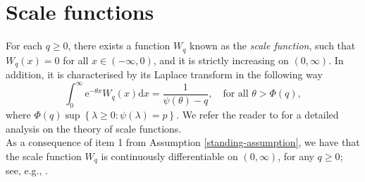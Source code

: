 \documentclass[10pt,a4paper]{amsart}
\newtheorem{remark}{Remark}[section]
\newcommand{\reals}{\mathbb{R}}
\newcommand{\diff}{\mathrm{d}}
\newcommand{\cH}{\mathcal{H}}
\renewcommand{\geq}{\geqslant}
\begin{document}
%
%
\section{Scale functions}\label{sect:scale}
For each $q \geq 0$, there exists a function $W_q$ known as the \textit{scale function}, such that $W_q(x) = 0$ for all $x\in (-\infty,0)$, and it is strictly increasing on $(0,\infty)$. In addition, it is characterised by its Laplace transform in the following way
\begin{equation}\label{scale:function:def}
	\int_0^\infty \mathrm{e}^{-\theta x} W_q (x) \mathrm{d}x = \frac{1}{\psi(\theta)-q} , \quad \text{for all $\theta> \Phi(q),$}
\end{equation}
where $\Phi(q)\sup \left\lbrace \lambda \geq 0 \colon \psi(\lambda)=p \right\rbrace$. We refer the reader to \cite{kuznetsov-et-al_2012} for a detailed analysis on the theory of scale functions.\\

As a consequence of item 1 from Assumption \ref{standing-assumption}, we have that the scale function $W_q$ is continuously differentiable on $(0,\infty)$, for any $q \geq 0$; see, e.g., \cite{kuznetsov-et-al_2012}.
\end{document}
